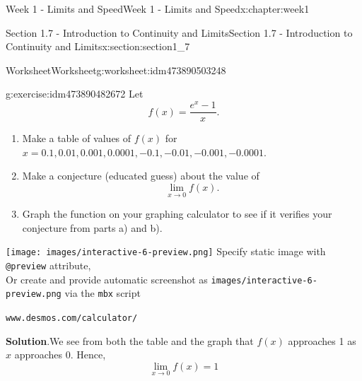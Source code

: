\documentclass[oneside,10pt,]{book}
\newcommand{\blocktitlefont}{\relax}
\newcommand{\mono}[1]{\texttt{#1}}
\numberwithin{equation}{section}
\newlength{\qrsize}
\newlength{\previewwidth}
\begin{document}
\begin{chapterptx}{Week 1 - Limits and Speed}{}{Week 1 - Limits and Speed}{}{}{x:chapter:week1}
\begin{sectionptx}{Section 1.7 - Introduction to Continuity and Limits}{}{Section 1.7 - Introduction to Continuity and Limits}{}{}{x:section:section1_7}
\begin{worksheet-subsection}{Worksheet}{}{Worksheet}{}{}{g:worksheet:idm473890503248}
\begin{divisionexercise}{3}{}{}{g:exercise:idm473890482672}%
Let%
\begin{equation*}
f(x) = \frac{e^x - 1}{x}. 
\end{equation*}
%
%
\begin{enumerate}[label=(\alph*)]
\item{}Make a table of values of \(f(x)\) for \(x=0.1,0.01,0.001,0.0001,-0.1,-0.01,-0.001,-0.0001\).%
\item{}Make a conjecture (educated guess) about the value of%
\begin{equation*}
\lim _{x\to 0} f(x) .
\end{equation*}
%
\item{}Graph the function on your graphing calculator to see if it verifies your conjecture from parts a) and b).%
\end{enumerate}
\setlength{\qrsize}{9em}
\setlength{\previewwidth}{\linewidth}
\addtolength{\previewwidth}{-\qrsize}
\begin{tcbraster}[raster columns=2, raster column skip=1pt, raster halign=center, raster force size=false, raster left skip=0pt, raster right skip=0pt]%
\begin{tcolorbox}[previewstyle, width=\previewwidth]%
%
{\texttt{[image: images/interactive-6-preview.png]}}%
{\small{}Specify static image with \mono{@preview} attribute,\\Or create and provide automatic screenshot as \mono{images/interactive-6-preview.png} via the \mono{mbx} script}%
\end{tcolorbox}%
\begin{tcolorbox}[qrstyle]%
{\hypersetup{urlcolor=black}}%
\end{tcolorbox}%
\begin{tcolorbox}[captionstyle]%
\small \mono{www.desmos.com/calculator/}\end{tcolorbox}%
\end{tcbraster}%
%
\textbf{\blocktitlefont Solution}.\hypertarget{g:solution:idm473890477360}{}\quad{}We see from both the table and the graph that \(f(x)\) approaches 1 as \(x\) approaches 0. Hence,%
\begin{equation*}
\lim_{x\to 0} f(x)=1
\end{equation*}
%
\par
\setlength{\qrsize}{9em}
\setlength{\previewwidth}{\linewidth}
\addtolength{\previewwidth}{-\qrsize}
\begin{tcbraster}[raster columns=2, raster column skip=1pt, raster halign=center, raster force size=false, raster left skip=0pt, raster right skip=0pt]%

\end{tcbraster}
\end{divisionexercise}
\end{worksheet-subsection}
\end{sectionptx}
\end{chapterptx}
\end{document}

